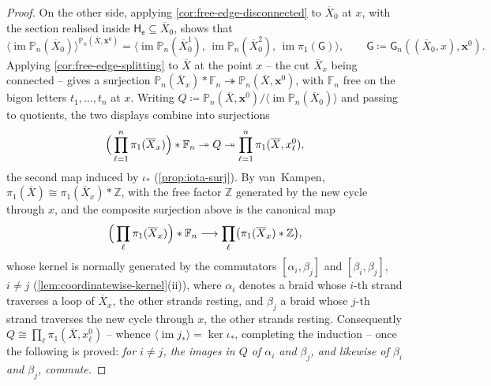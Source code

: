 \documentclass[reqno]{amsart}
\theoremstyle{definition}
\newcommand\bfx{\mathbf{x}}
\newcommand\sfG{\mathsf{G}}
\newcommand\sfH{\mathsf{H}}
\newcommand\sfe{\mathsf{e}}
\newcommand{\PB}{\mathbb{P}}
\newcommand{\im}{\operatorname{im}}
\newcommand{\co}[1]{\mathopen{\langle}#1\mathclose{\rangle}} %
\newcommand{\base}{\bfx^0}
\renewcommand{\bar}{\overline}
\numberwithin{equation}{section}
\begin{document}
\begin{proof}
On the other side, applying \cref{cor:free-edge-disconnected} to
\(\bar X_0\) at \(x\), with the section realised inside
\(\sfH_\sfe\subseteq\bar X_0\), shows that
\[
\co{\im\PB_n(\bar X_0)}^{\PB_n(\bar X,\base)}
=\co{\im\PB_n(\bar X^1_0),\,\im\PB_n(\bar X^2_0),\,
\im\pi_1(\sfG)},
\qquad
\sfG\coloneqq\sfG_n((\bar X_0,x),\base).
\]
Applying \cref{cor:free-edge-splitting} to \(\bar X\) at the
point \(x\) -- the cut \(\bar X_x\) being connected -- gives a
surjection
\(\PB_n(\bar X_x)\ast\mathbb{F}_n\twoheadrightarrow
\PB_n(\bar X,\base)\), with \(\mathbb{F}_n\) free on the bigon
letters \(t_1,\dots,t_n\) at \(x\). Writing
\(Q\coloneqq\PB_n(\bar X,\base)\big/\co{\im\PB_n(\bar X_0)}\)
and passing to quotients, the two displays combine into
surjections
\[
\Bigl(\,\prod_{\ell=1}^n\pi_1(\bar X_x)\Bigr)\ast\mathbb{F}_n
\twoheadrightarrow Q
\twoheadrightarrow\prod_{\ell=1}^n\pi_1(\bar X,x^0_\ell),
\]
the second map induced by \(\iota_\ast\)
(\cref{prop:iota-surj}). By van~Kampen,
\(\pi_1(\bar X)\cong\pi_1(\bar X_x)\ast\mathbb{Z}\), with the
free factor \(\mathbb{Z}\) generated by the new cycle through
\(x\), and the composite surjection above is the canonical map
\[
\Bigl(\,\prod_{\ell}\pi_1(\bar X_x)\Bigr)\ast\mathbb{F}_n
\longrightarrow
\prod_{\ell}\bigl(\pi_1(\bar X_x)\ast\mathbb{Z}\bigr),
\]
whose kernel is normally generated by the commutators
\([\alpha_i,\beta_j]\) and \([\beta_i,\beta_j]\), \(i\neq j\)
(\cref{lem:coordinatewise-kernel}(ii)), where
\(\alpha_i\) denotes a braid whose \(i\)-th
strand traverses a loop of \(\bar X_x\), the other strands
resting, and \(\beta_j\) a braid whose \(j\)-th strand traverses
the new cycle through \(x\), the other strands resting.
Consequently \(Q\cong\prod_\ell\pi_1(\bar X,x^0_\ell)\) --
whence \(\co{\im j_\ast}=\ker\iota_\ast\), completing the
induction -- once the following is proved: \emph{for
\(i\neq j\), the images in \(Q\) of \(\alpha_i\) and
\(\beta_j\), and likewise of \(\beta_i\) and \(\beta_j\),
commute.}


\end{proof}
\end{document}
